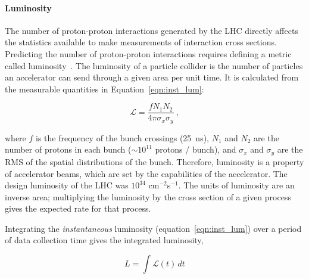 \paragraph*{Luminosity} \hfill \break
The number of proton-proton interactions generated by the LHC directly affects the statistics available to make measurements of interaction cross sections.
Predicting the number of proton-proton interactions requires defining a metric called luminosity~\cite{zyla_review_2020}. The luminosity of a particle collider is the number of particles an accelerator can send through a given area per unit time. It is calculated from the measurable quantities in Equation~\ref{eqn:inst_lum}:

\begin{equation}
\mathcal{L} = \frac{f N_{1} N_{2} }{4 \pi \sigma_{x} \sigma_{y}}~,
\label{eqn:inst_lum}
\end{equation}

where $f$ is the frequency of the bunch crossings (\SI{25}{\nano\second}), $N_{1}$ and $N_{2}$ are the number of protons in each bunch ($\sim 10^{11}$ protons / bunch), and $\sigma_{x}$ and $\sigma_{y}$ are the RMS of the spatial distributions of the bunch. Therefore, luminosity is a property of accelerator beams, which are set by the capabilities of the accelerator. The design luminosity of the LHC was $10^{34}$ cm$^{-2}$s$^{-1}$. The units of luminosity are an inverse area; multiplying the luminosity by the cross section of a given process gives the expected rate for that process.

Integrating the \textit{instantaneous} luminosity (equation~\ref{eqn:inst_lum}) over a period of data collection time gives the integrated luminosity,

\begin{equation}
L = \int \mathcal{L} \left( t \right) \,dt
\label{eqn:int_lum}
\end{equation}

